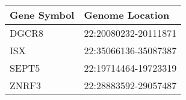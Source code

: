 \begin{tabular}{ll}
\toprule
Gene Symbol &      Genome Location \\
\midrule
      DGCR8 & 22:20080232-20111871 \\
        ISX & 22:35066136-35087387 \\
      SEPT5 & 22:19714464-19723319 \\
      ZNRF3 & 22:28883592-29057487 \\
\bottomrule
\end{tabular}
